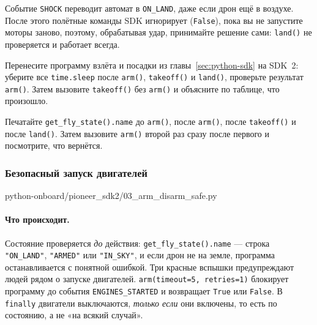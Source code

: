 \begin{alertbox}
Событие \verb|SHOCK| переводит автомат в \verb|ON_LAND|, даже если дрон ещё в воздухе. После этого полётные команды SDK игнорирует (\verb|False|), пока вы не запустите моторы заново, поэтому, обрабатывая удар, принимайте решение сами: \verb|land()| не проверяется и работает всегда.
\end{alertbox}

\begin{taskbox}
Перенесите программу взлёта и посадки из главы~\ref{sec:python-sdk} на SDK~2: уберите все \verb|time.sleep| после \verb|arm()|, \verb|takeoff()| и \verb|land()|, проверьте результат \verb|arm()|. Затем вызовите \verb|takeoff()| без \verb|arm()| и объясните по таблице, что произошло.
\end{taskbox}

\begin{taskbox}
Печатайте \verb|get_fly_state().name| до \verb|arm()|, после \verb|arm()|, после \verb|takeoff()| и после \verb|land()|. Затем вызовите \verb|arm()| второй раз сразу после первого и посмотрите, что вернётся.
\end{taskbox}

\subsubsection*{Безопасный запуск двигателей}

\begin{codefile}[python]{python-onboard/pioneer_sdk2/03_arm_disarm_safe.py}
\end{codefile}

\paragraph{Что происходит.} Состояние проверяется \emph{до} действия: \verb|get_fly_state().name| --- строка \texttt{"ON\_LAND"}, \texttt{"ARMED"} или \texttt{"IN\_SKY"}, и если дрон не на земле, программа останавливается с понятной ошибкой. Три красные вспышки предупреждают людей рядом о запуске двигателей. \verb|arm(timeout=5, retries=1)| блокирует программу до события \texttt{ENGINES\_STARTED} и возвращает \verb|True| или \verb|False|. В \verb|finally| двигатели выключаются, \emph{только если} они включены, то есть по состоянию, а не «на всякий случай».

